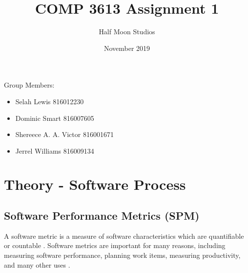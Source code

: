 \documentclass{article}
\title{COMP 3613 Assignment 1}
\author{Half Moon Studios}
\date{November 2019}
\begin{document}
\maketitle
\vfill
Group Members:
\begin{itemize}
	\item []Selah Lewis 816012230 
	\item []Dominic Smart 816007605
	\item []Shereece A. A. Victor 816001671
	\item []Jerrel Williams 816009134
\end{itemize}

\newpage
\tableofcontents

\newpage
\section{Theory - Software Process}
\subsection{Software Performance Metrics (SPM) }


	
A software metric is a measure of software characteristics which are quantifiable or countable \cite{stacify}. Software metrics are important for many reasons, including measuring software performance, planning work items, measuring productivity, and many other uses \cite{stacify}.\\
   
\end{document}
